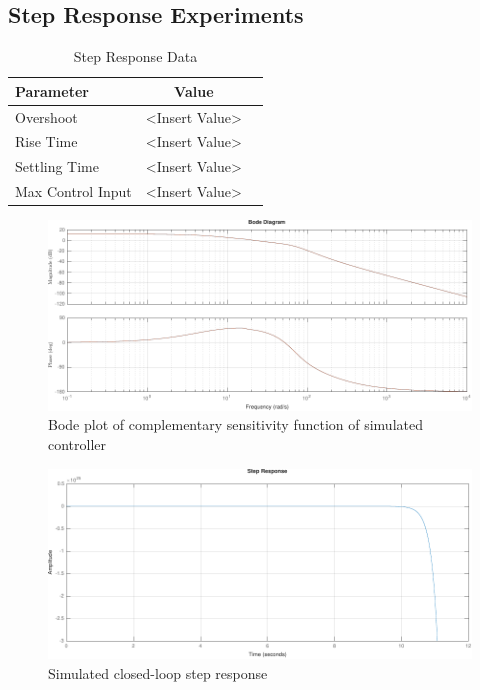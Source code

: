 \documentclass[11pt]{article}
\begin{document}
\subsection{Step Response Experiments}
\begin{table}[h!]
    \centering
    \begin{tabular}{@{}lcc@{}}
    \toprule
    \textbf{Parameter} & \textbf{Value} \\
    \midrule
    Overshoot & <Insert Value> \\
    Rise Time & <Insert Value> \\
    Settling Time & <Insert Value> \\
    Max Control Input & <Insert Value> \\
    \bottomrule
    \end{tabular}
    \caption{Step Response Data}
    \label{tab:step_response}
\end{table}
    
\begin{figure}[!ht]
\centering
\includegraphics[width=\textwidth]{bodecompsense.pdf}
\caption{Bode plot of complementary sensitivity function of simulated controller}
\label{fig:bodecompsense}
\end{figure}

\begin{figure}[!ht]
\centering
\includegraphics[width=\textwidth]{bodecompsenseStep.pdf}
\caption{Simulated closed-loop step response}
\label{fig:bodecompsenseStep}
\end{figure}
\end{document}
